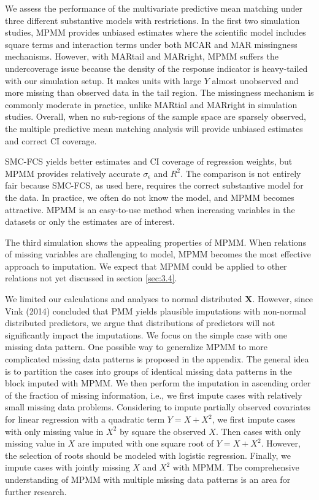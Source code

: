 	We assess the performance of the multivariate predictive mean matching under three different substantive models with restrictions. In the first two simulation studies, MPMM provides unbiased estimates where the scientific model includes square terms and interaction terms under both MCAR and MAR missingness mechanisms. However, with MARtail and MARright, MPMM suffers the undercoverage issue because the density of the response indicator is heavy-tailed with our simulation setup. It makes units with large $Y$ almost unobserved and more missing than observed data in the tail region. The missingness mechanism is commonly moderate in practice, unlike MARtial and MARright in simulation studies. Overall, when no sub-regions of the sample space are sparsely observed, the multiple predictive mean matching analysis will provide unbiased estimates and correct CI coverage. 
	
	SMC-FCS yields better estimates and CI coverage of regression weights, but MPMM provides relatively accurate $\sigma_\epsilon$ and $R^2$. The comparison is not entirely fair because SMC-FCS, as used here, requires the correct substantive model for the data. In practice, we often do not know the model, and MPMM becomes attractive. MPMM is an easy-to-use method when increasing variables in the datasets or only the estimates are of interest. 
	
	The third simulation shows the appealing properties of MPMM. When relations of missing variables are challenging to model, MPMM becomes the most effective approach to imputation. We expect that MPMM could be applied to other relations not yet discussed in section \ref{sec:3.4}.    
	
	We limited our calculations and analyses to normal distributed $\boldsymbol{X}$. However, since Vink (2014) concluded that PMM yields plausible imputations with non-normal distributed predictors, we argue that distributions of predictors will not significantly impact the imputations. We focus on the simple case with one missing data pattern. One possible way to generalize MPMM to more complicated missing data patterns is proposed in the appendix. The general idea is to partition the cases into groups of identical missing data patterns in the block imputed with MPMM. We then perform the imputation in ascending order of the fraction of missing information, i.e., we first impute cases with relatively small missing data problems. Considering to impute partially observed covariates for linear regression with a quadratic term $Y = X + X^2$, we first impute cases with only missing value in $X^2$ by square the observed $X$. Then cases with only missing value in $X$ are imputed with one square root of $Y = X + X^2$. However, the selection of roots should be modeled with logistic regression. Finally, we impute cases with jointly missing $X$ and $X^2$ with MPMM. The comprehensive understanding of MPMM with multiple missing data patterns is an area for further research.         
	
